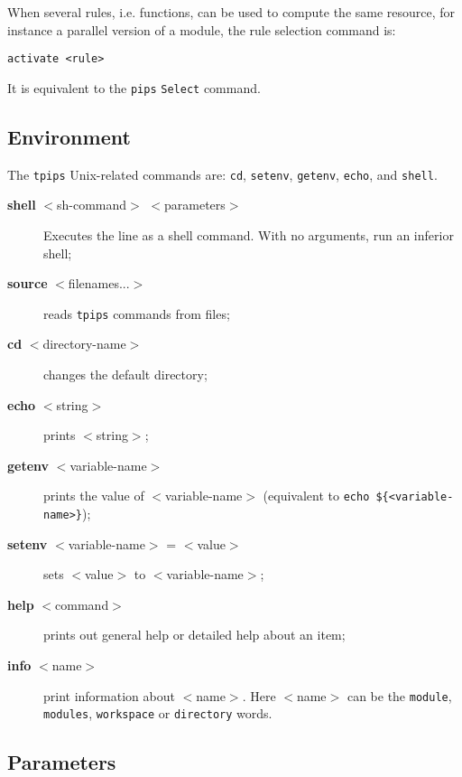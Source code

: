 \documentclass[a4paper,12pt]{article}
\begin{document}
When several rules, i.e. functions, can be used to compute
the same resource, for instance a parallel version of a
module, the rule selection command is:

{\bf
\begin{verbatim}
activate <rule>
\end{verbatim}
}

It is equivalent to the \texttt{pips} \texttt{Select} command.

\subsection{Environment}

The {\tt tpips} Unix-related commands are: \texttt{cd}, \texttt{setenv},
\texttt{getenv}, \texttt{echo}, and \texttt{shell}.

\begin{description}

\item[{\bf shell} $<$sh-command$>$ $<$parameters$>$] Executes the line
  as a shell command. With no arguments, run an inferior shell;

\item[{\bf source} $<$filenames...$>$] reads {\tt tpips} commands from
  files;

\item[{\bf cd} $<$directory-name$>$] changes the default directory;

\item[{\bf echo} $<$string$>$] prints $<$string$>$;

\item[{\bf getenv} $<$variable-name$>$] prints the value of
  $<$variable-name$>$ (equivalent to \verb+echo ${<variable-name>}+);
\item[{\bf setenv} $<$variable-name$>$ = $<$value$>$] sets $<$value$>$ to $<$variable-name$>$;

\item[{\bf help} $<$command$>$] prints out general help or detailed help
  about an item;

\item[{\bf info} $<$name$>$] print information about $<$name$>$. Here
  $<$name$>$ can be the \texttt{module}, \texttt{modules},
  \texttt{workspace} or \texttt{directory} words.

\end{description}


\subsection{Parameters}
\end{document}

